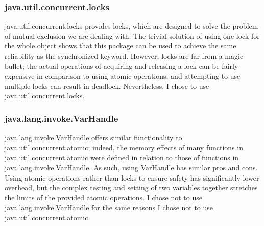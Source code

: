 \documentclass[letterpaper,twocolumn,10pt]{article}
\begin{document}
\subsubsection{java.util.concurrent.locks}
java.util.concurrent.locks provides locks, which are designed to solve the problem of mutual exclusion we are dealing with. The trivial solution of using one lock for the whole object shows that this package can be used to achieve the same reliability as the synchronized keyword. However, locks are far from a magic bullet; the actual operations of acquiring and releasing a lock can be fairly expensive in comparison to using atomic operations, and attempting to use multiple locks can result in deadlock. Nevertheless, I chose to use java.util.concurrent.locks. \\
\subsubsection{java.lang.invoke.VarHandle}
java.lang.invoke.VarHandle offers similar functionality to java.util.concurrent.atomic; indeed, the memory effects of many functions in java.util.concurrent.atomic were defined in relation to those of functions in java.lang.invoke.VarHandle. As such, using VarHandle has similar pros and cons. Using atomic operations rather than locks to ensure safety has significantly lower overhead, but the complex testing and setting of two variables together stretches the limits of the provided atomic operations. I chose not to use java.lang.invoke.VarHandle for the same reasons I chose not to use java.util.concurrent.atomic. \\
\end{document}
